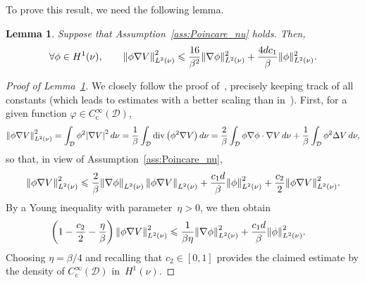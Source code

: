\documentclass{article}
\newtheorem{lemma}{Lemma}
\newcommand{\cD}{\mathcal{D}}
\renewcommand{\leq}{\leqslant}
\begin{document}

To prove this result, we need the following lemma.

\begin{lemma}
  \label{lem:VillaniA24}
Suppose that Assumption~\ref{ass:Poincare_nu} holds. Then,
\begin{equation}
  \label{Villanilemma}
  \forall \phi \in H^{1}\qty(\nu),
  \qquad
  \left\| \phi \nabla V\right\|^2_{L^2\qty(\nu)} \leq \frac{16}{\beta^2} \|\nabla \phi\|^2_{L^2\qty(\nu)} + \frac{4d c_1}{\beta} \|\phi\|^2_{L^2\qty(\nu)}.
\end{equation}
\end{lemma}

\begin{proof}[Proof of Lemma~\ref{lem:VillaniA24}]
We closely follow the proof of~\cite[Lemma~A.24]{Villani09}, precisely keeping track of all constants (which leads to estimates with a better scaling than in~\cite[Lemma~2.2]{CLW19}). First, for a given function $\varphi \in C_\mathrm{c}^\infty(\cD)$, 
\[
\left\|\phi \nabla V \right\|^2_{L^2\qty(\nu)} =\int_\cD \phi^2 \abs{\nabla V}^2 \, d\nu = \frac1\beta \int_\cD \mathrm{div}\left(\phi^2 \nabla V\right) d\nu = \frac{2}{\beta} \int_\cD \phi \nabla \phi \cdot \nabla V \, d\nu + \frac{1}{\beta}\int_\cD \phi^2 \Delta V \, d\nu,
\]
so that, in view of Assumption~\ref{ass:Poincare_nu}, 
\[
  \norm{ \phi \nabla V}^2_{L^2\qty(\nu)} \leq  \frac{2}{\beta} \norm{\nabla \phi}_{L^2\qty(\nu)} \, \norm{ \phi \nabla V}_{L^2\qty(\nu)} + \frac{c_1 d}{\beta} \norm{ \phi }_{L^2\qty(\nu)}^2 + \frac{c_2}{2} \norm{ \phi \nabla V}_{L^2\qty(\nu)}^2.
\]
By a Young inequality with parameter~$\eta>0$, we then obtain 
\[
\begin{aligned}
\left(1-\frac{c_2}{2}-\frac{\eta}{\beta}\right)\left\| \phi \nabla V\right\|^2_{L^2\qty(\nu)} & \leq \frac{1}{\beta \eta} \norm{\nabla \phi}^2_{L^2\qty(\nu)} + \frac{c_1 d}{\beta} \norm{ \phi }_{L^2\qty(\nu)}^2.
\end{aligned}
\]
Choosing $\eta = \beta/4$ and recalling that $c_2 \in [0,1]$  
provides the claimed estimate by the density of $C_\mathrm{c}^\infty(\cD)$ in~$H^1(\nu)$. 
\end{proof}
\end{document}
